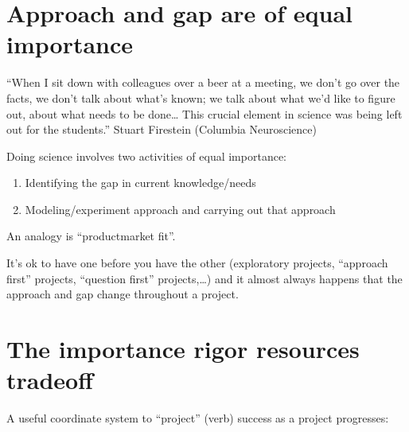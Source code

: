 \documentclass[letterpaper,10pt,english]{sphinxmanual}
\let\sphinxpxdimen\pdfpxdimen\else\newdimen\sphinxpxdimen
\begin{document}
\section{Approach and gap are of equal importance}
\label{\detokenize{02Elements:approach-and-gap-are-of-equal-importance}}
\sphinxAtStartPar
“When I sit down with colleagues over a beer at a meeting, we don’t go over the facts, we don’t talk about what’s known; we talk about what we’d like to figure out, about what needs to be done… This crucial element in science was being left out for the students.” \sphinxhyphen{} Stuart Firestein (Columbia Neuroscience)

\sphinxAtStartPar
Doing science involves two activities of equal importance:
\begin{enumerate}
%
\item {} 
\sphinxAtStartPar
Identifying the gap in current knowledge/needs

\item {} 
\sphinxAtStartPar
Modeling/experiment approach and carrying out that approach

\end{enumerate}

\noindent\sphinxincludegraphics[width=400\sphinxpxdimen]{{figGapApproach}.pdf}

\sphinxAtStartPar
An analogy is “product\sphinxhyphen{}market fit”.

\sphinxAtStartPar
It’s ok to have one before you have the other (exploratory projects, “approach first” projects, “question first” projects,…) and it almost always happens that the approach and gap change throughout a project.


\section{The importance rigor resources trade\sphinxhyphen{}off}
\label{\detokenize{02Elements:the-importance-rigor-resources-trade-off}}
\sphinxAtStartPar
A useful coordinate system to “project” (verb) success as a project progresses:
\end{document}
